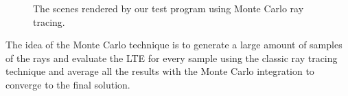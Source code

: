 \begin{figure}[htp]
\begin{center}
    \renewcommand{\thefigure}{\thechapter.\arabic{figure}}
    \caption[Test Scenes Rendered Using Monte-Carlo Ray Tracing]{The scenes rendered by our test program using Monte Carlo ray tracing. }
    \label{fig:rt_images}
\end{center}
\end{figure}


The idea of the Monte Carlo technique is to generate a large amount of samples of the rays and evaluate the LTE for every sample using the classic ray tracing technique and average all the results with the Monte Carlo integration to converge to the final solution.


